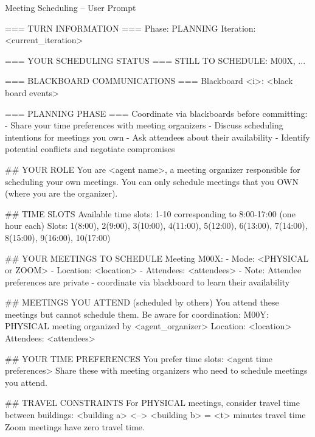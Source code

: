 \begin{promptbox}{Meeting Scheduling -- User Prompt}
\begin{linebreaks}
=== TURN INFORMATION ===
Phase: PLANNING
Iteration: <current\_iteration>

=== YOUR SCHEDULING STATUS ===
STILL TO SCHEDULE:
  M00X, ...

=== BLACKBOARD COMMUNICATIONS ===
Blackboard <i>:
<black board events>

=== PLANNING PHASE ===
Coordinate via blackboards before committing:
\hspace{15pt}- Share your time preferences with meeting organizers
\hspace{15pt}- Discuss scheduling intentions for meetings you own
\hspace{15pt}- Ask attendees about their availability
\hspace{15pt}- Identify potential conflicts and negotiate compromises

\#\# YOUR ROLE
You are <agent name>, a meeting organizer responsible for scheduling your own meetings.
You can only schedule meetings that you OWN (where you are the organizer).

\#\# TIME SLOTS
Available time slots: 1-10 corresponding to 8:00-17:00 (one hour each)
Slots: 1(8:00), 2(9:00), 3(10:00), 4(11:00), 5(12:00), 6(13:00), 7(14:00), 8(15:00), 9(16:00), 10(17:00)

\#\# YOUR MEETINGS TO SCHEDULE
Meeting M00X:
  \hspace{15pt}- Mode: <PHYSICAL or ZOOM>
  \hspace{15pt}- Location: <location>
  \hspace{15pt}- Attendees: <attendees>
  \hspace{15pt}- Note: Attendee preferences are private - coordinate via blackboard to learn their availability

\#\# MEETINGS YOU ATTEND (scheduled by others)
You attend these meetings but cannot schedule them. Be aware for coordination:
  \hspace{15pt}M00Y: PHYSICAL meeting organized by <agent\_organizer>
    \hspace{30pt}Location: <location>
    \hspace{30pt}Attendees: <attendees>

\#\# YOUR TIME PREFERENCES
You prefer time slots: <agent time preferences>
Share these with meeting organizers who need to schedule meetings you attend.

\#\# TRAVEL CONSTRAINTS
For PHYSICAL meetings, consider travel time between buildings:
  \hspace{15pt}<building a> <--> <building b> = <t> minutes travel time
\hspace{15pt}Zoom meetings have zero travel time.


\end{linebreaks}
\end{promptbox}

